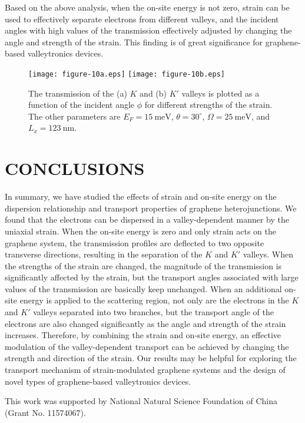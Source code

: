 \documentclass[reprint,amsmath,amssymb,aps,superscriptaddress]{revtex4-2}
\begin{document}
Based on the above analysis, when the on-site energy is not zero, strain can be used to effectively separate electrons from different valleys, and the incident angles with high values of the transmission effectively adjusted by changing the angle and strength of the strain. This finding is of great significance for graphene-based valleytronics devices.
\begin{figure}[t]
	\centering
	\texttt{[image: figure-10a.eps]}%
	\texttt{[image: figure-10b.eps]}%
	\caption{\label{fig:TransT10} The transmission of the (a) $K$ and (b) $K'$ valleys is plotted as a function of the incident angle $\phi$ for different strengths of the strain. The other parameters are $E_F=15\ \mathrm{meV}$, $\theta=30^\circ$, $\Omega=25\ \mathrm{meV}$, and $L_{x}=123\ \mathrm{nm}$.}
\end{figure}

\section{CONCLUSIONS}\label{sec:Conclusions}
In summary, we have studied the effects of strain and on-site energy on the dispersion relationship and transport properties of graphene heterojunctions. We found that the electrons can be dispersed in a valley-dependent manner by the uniaxial strain. When the on-site energy is zero and only strain acts on the graphene system, the transmission profiles are deflected to two opposite transverse directions, resulting in the separation of the $K$ and $K'$ valleys. When the strengths of the strain are changed, the magnitude of the transmission is significantly affected by the strain, but the transport angles associated with large values of the transmission are basically keep unchanged. When an additional on-site energy is applied to the scattering region, not only are the electrons in the $K$ and $K'$ valleys separated into two branches, but the transport angle of the electrons are also changed significantly as the angle and strength of the strain increases. Therefore, by combining the strain and on-site energy, an effective modulation of the valley-dependent transport can be achieved by changing the strength and direction of the strain. Our results may be helpful for exploring the transport mechanism of strain-modulated graphene systems and the design of novel types of graphene-based valleytronics devices.


\begin{acknowledgments}
This work was supported by National Natural Science Foundation of China (Grant No. 11574067).
\end{acknowledgments}
\end{document}
